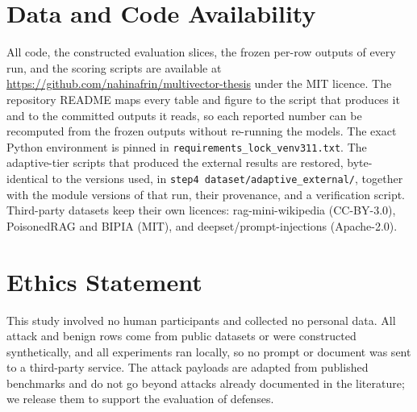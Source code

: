 \documentclass[conference]{IEEEtran}
\begin{document}
\section*{Data and Code Availability}
All code, the constructed evaluation slices, the frozen per-row outputs of every run, and the scoring scripts are available at \url{https://github.com/nahinafrin/multivector-thesis} under the MIT licence. The repository README maps every table and figure to the script that produces it and to the committed outputs it reads, so each reported number can be recomputed from the frozen outputs without re-running the models. The exact Python environment is pinned in \texttt{requirements\_lock\_venv311.txt}. The adaptive-tier scripts that produced the external results are restored, byte-identical to the versions used, in \texttt{step4 dataset/adaptive\_external/}, together with the module versions of that run, their provenance, and a verification script. Third-party datasets keep their own licences: rag-mini-wikipedia (CC-BY-3.0), PoisonedRAG and BIPIA (MIT), and deepset/prompt-injections (Apache-2.0).

\section*{Ethics Statement}
This study involved no human participants and collected no personal data. All attack and benign rows come from public datasets or were constructed synthetically, and all experiments ran locally, so no prompt or document was sent to a third-party service. The attack payloads are adapted from published benchmarks and do not go beyond attacks already documented in the literature; we release them to support the evaluation of defenses.



\end{document}
